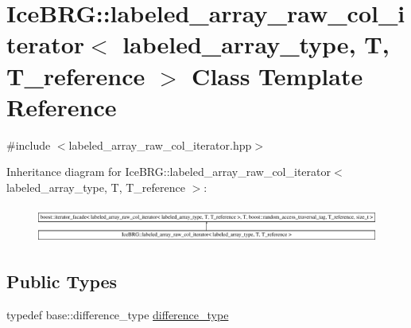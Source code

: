 \hypertarget{classIceBRG_1_1labeled__array__raw__col__iterator}{}\section{Ice\+B\+R\+G\+:\+:labeled\+\_\+array\+\_\+raw\+\_\+col\+\_\+iterator$<$ labeled\+\_\+array\+\_\+type, T, T\+\_\+reference $>$ Class Template Reference}
\label{classIceBRG_1_1labeled__array__raw__col__iterator}


{\ttfamily \#include $<$labeled\+\_\+array\+\_\+raw\+\_\+col\+\_\+iterator.\+hpp$>$}

Inheritance diagram for Ice\+B\+R\+G\+:\+:labeled\+\_\+array\+\_\+raw\+\_\+col\+\_\+iterator$<$ labeled\+\_\+array\+\_\+type, T, T\+\_\+reference $>$\+:\begin{figure}[H]
\begin{center}
\leavevmode
\includegraphics[height=1.212121cm]{classIceBRG_1_1labeled__array__raw__col__iterator}
\end{center}
\end{figure}
\subsection*{Public Types}
\begin{DoxyCompactItemize}
\item 
typedef base\+::difference\+\_\+type \hyperlink{classIceBRG_1_1labeled__array__raw__col__iterator_aadef267d0a30f898af83e9ebf6716b46}{difference\+\_\+type}
\end{DoxyCompactItemize}
